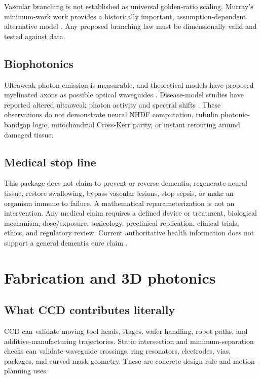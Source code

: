 \documentclass[11pt,a4paper,openany]{book}
\begin{document}
Vascular branching is not established as universal golden-ratio scaling. Murray's minimum-work work provides a historically important, assumption-dependent alternative model \citep{murray1926}. Any proposed branching law must be dimensionally valid and tested against data.

\section{Biophotonics}
Ultraweak photon emission is measurable, and theoretical models have proposed myelinated axons as possible optical waveguides \citep{kumar2016myelin}. Disease-model studies have reported altered ultraweak photon activity and spectral shifts \citep{wang2023biophoton,sefati2024upe}. These observations do not demonstrate neural NHDF computation, tubulin photonic-bandgap logic, mitochondrial Cross-Kerr parity, or instant rerouting around damaged tissue.

\section{Medical stop line}
\begin{warningbox}
This package does not claim to prevent or reverse dementia, regenerate neural tissue, restore swallowing, bypass vascular lesions, stop sepsis, or make an organism immune to failure. A mathematical reparameterization is not an intervention. Any medical claim requires a defined device or treatment, biological mechanism, dose/exposure, toxicology, preclinical replication, clinical trials, ethics, and regulatory review. Current authoritative health information does not support a general dementia cure claim \citep{nia2026dementia}.
\end{warningbox}

\chapter{Fabrication and 3D photonics}
\section{What CCD contributes literally}
CCD can validate moving tool heads, stages, wafer handling, robot paths, and additive-manufacturing trajectories. Static intersection and minimum-separation checks can validate waveguide crossings, ring resonators, electrodes, vias, packages, and curved mask geometry. These are concrete design-rule and motion-planning uses.
\end{document}
